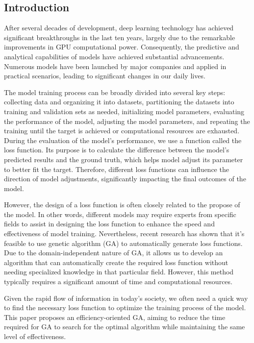 \begin{ZhChapter}

\chapter{Introduction}

After several decades of development, deep learning \cite{deepLearning} technology has achieved significant breakthroughs in the last ten years, largely due to the remarkable improvements in GPU computational power. Consequently, the predictive and analytical capabilities of models have achieved substantial advancements. Numerous models have been launched by major companies and applied in practical scenarios, leading to significant changes in our daily lives.

The model training process can be broadly divided into several key steps: collecting data and organizing it into datasets, partitioning the datasets into training and validation sets as needed, initializing model parameters, evaluating the performance of the model, adjusting the model parameters, and repeating the training until the target is achieved or computational resources are exhausted. During the evaluation of the model's performance, we use a function called the loss function\cite{janocha2017lossfunctionsdeepneural}. Its purpose is to calculate the difference between the model's predicted results and the ground truth, which helps model adjust its parameter to better fit the target. Therefore, different loss functions can influence the direction of model adjustments, significantly impacting the final outcomes of the model.

However, the design of a loss function is often closely related to the propose of the model\cite{lossFunctionMakeDifference}. In other words, different models may require experts from specific fields to assist in designing the loss function to enhance the speed and effectiveness of model training. Nevertheless, recent research has shown that it’s feasible to use genetic algorithm (GA) \cite{geneticProgramming} to automatically generate loss functions. Due to the domain-independent nature of GA, it allows us to develop an algorithm that can automatically create the required loss function without needing specialized knowledge in that particular field. However, this method typically requires a significant amount of time and computational resources.

Given the rapid flow of information in today's society, we often need a quick way to find the necessary loss function to optimize the training process of the model. This paper proposes an efficiency-oriented GA, aiming to reduce the time required for GA to search for the optimal algorithm while maintaining the same level of effectiveness.


\end{ZhChapter}
